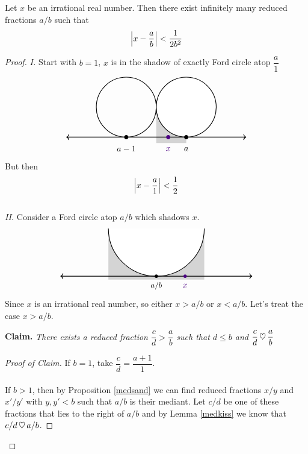 \begin{theorem}
Let $x$ be an irrational real number. Then there exist infinitely many reduced fractions $a/b$ such that
\[\left\lvert x- \frac{a}{b}\right\rvert < \frac{1}{2b^2}\]
\end{theorem}
\begin{proof}
\emph{I.} Start with $b=1$, $x$ is in the shadow of exactly Ford circle atop $\dfrac{a}{1}$
\[\begin{tikzpicture}[scale=2.5]
    \draw[thick](-2,0.5) circle (0.5);
    \draw [draw=none, fill=lightgrey] (-1.5,-0.1) rectangle (-1,0.5);
    \draw[thick,black,fill=white](-1,0.5) circle (0.5);
    \draw[<->,thick] (-3,0)--(0,0);
    \foreach \x in {-2,-1}
    {
    \fill (\x,0) circle (1pt);
    }
    \node[] at (-1,-0.2) {$a$};
    \node[] at (-2,-0.2) {$a-1$};
    \fill[color=indigo] (-1.3,0) circle (1pt);
    \node[color=indigo] at (-1.3,-0.2) {$x$};
\end{tikzpicture}\]
But then
\[\left\lvert x - \frac{a}{1}\right\rvert < \frac{1}{2}\]
\vspace*{0.5em}\\
\emph{II.} Consider a Ford circle atop $a/b$ which shadows $x$.
\[\begin{tikzpicture}[scale=4]
    \draw [draw=none, fill=lightgrey] (-1.5,-0.035) rectangle (-2.5,0.45);
    \draw[thick,black,fill=white] (-1.5,0.5) (-2.5,0.5) arc(0:180:-0.5);
    \draw[<->,thick] (-3,0)--(-1,0);
    \fill (-2,0) circle (0.5pt);
    \node[] at (-2,-0.1) {\small $a/b$};
    \fill[color=indigo] (-1.7,0) circle (0.5pt);
    \node[color=indigo] at (-1.7,-0.1) {$x$};
\end{tikzpicture}\]
Since $x$ is an irrational real number, so either $x>a/b$ or $x< a/b$. Let's treat the case $x > a/b$.\\
\begin{subproof}
{\bf Claim.} \emph{There exists a reduced fraction $\dfrac{c}{d}>\dfrac{a}{b}$ such that $d\leq b$ and $\dfrac{c}{d}\,\heartsuit\, \dfrac{a}{b}$}
\begin{proof}[Proof of Claim]
If $b = 1$, take $\dfrac{c}{d} = \dfrac{a+1}{1}$.\\
\\
If $b>1$, then by Proposition \ref{medsand} we can find reduced fractions $x/y$ and $x'/y'$ with $y,y'<b$ such that $a/b$ is their mediant. Let $c/d$ be one of these fractions that lies to the right of $a/b$ and by Lemma \ref{medkiss} we know that $c/d \,\heartsuit\, a/b$.
\end{proof}
\vspace*{0.005em}

\end{subproof}
\end{proof}
